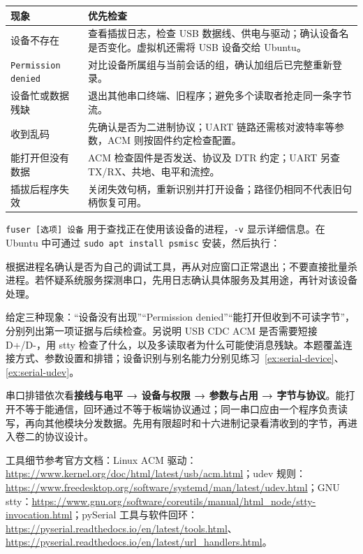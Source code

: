 \begin{center}
\begin{tabular}{p{}p{}}
\toprule[1.5pt]
现象 & 优先检查 \\
\midrule[1pt]
设备不存在 & 查看插拔日志，检查 USB 数据线、供电与驱动；确认设备名是否变化。虚拟机还需将 USB 设备交给 Ubuntu。\\
\texttt{Permission denied} & 对比设备所属组与当前会话的组，确认加组后已完整重新登录。\\
设备忙或数据残缺 & 退出其他串口终端、旧程序；避免多个读取者抢走同一条字节流。\\
收到乱码 & 先确认是否为二进制协议；UART 链路还需核对波特率等参数，ACM 则按固件约定检查配置。\\
能打开但没有数据 & ACM 检查固件是否发送、协议及 DTR 约定；UART 另查 TX/RX、共地、电平和流控。\\
插拔后程序失效 & 关闭失效句柄，重新识别并打开设备；路径仍相同不代表旧句柄恢复可用。\\
\bottomrule[1.5pt]
\end{tabular}
\end{center}

\begin{example}[查找设备占用者]
\texttt{fuser [选项] 设备} 用于查找正在使用该设备的进程，\texttt{-v} 显示详细信息。在 Ubuntu 中可通过 \texttt{sudo apt install psmisc} 安装，然后执行：




根据进程名确认是否为自己的调试工具，再从对应窗口正常退出；不要直接批量杀进程。若怀疑系统服务探测串口，先用日志确认具体服务及其用途，再针对该设备处理。
\end{example}

\begin{exercise}\label{ex:serial-diagnosis}
给定三种现象：“设备没有出现”“Permission denied”“能打开但收到不可读字节”，分别列出第一项证据与后续检查。另说明 USB CDC ACM 是否需要短接 D+/D-，用 stty 检查了什么，以及多读取者为什么可能使消息残缺。本题覆盖连接方式、参数设置和排错；设备识别与别名能力分别见练习~\ref{ex:serial-device}、\ref{ex:serial-udev}。
\end{exercise}
\begin{conclusion}
串口排错依次看\textbf{接线与电平 → 设备与权限 → 参数与占用 → 字节与协议}。能打开不等于能通信，回环通过不等于板端协议通过；同一串口应由一个程序负责读写，再向其他模块分发数据。先用有限超时和十六进制记录看清收到的字节，再进入卷二的协议设计。
\end{conclusion}

\begin{note}
工具细节参考官方文档：Linux ACM 驱动：\url{https://www.kernel.org/doc/html/latest/usb/acm.html}；udev 规则：\url{https://www.freedesktop.org/software/systemd/man/latest/udev.html}；GNU stty：\url{https://www.gnu.org/software/coreutils/manual/html_node/stty-invocation.html}；pySerial 工具与软件回环：\url{https://pyserial.readthedocs.io/en/latest/tools.html}、\url{https://pyserial.readthedocs.io/en/latest/url_handlers.html}。
\end{note}
\endgroup
